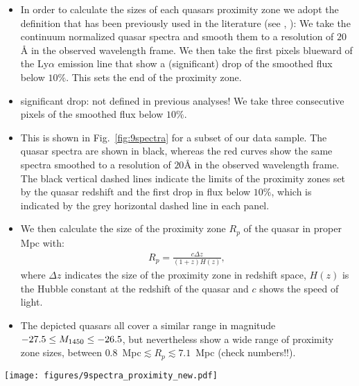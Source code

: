 \documentclass[iop]{emulateapj}
\newcommand{\lya} {Ly$\alpha$\xspace}
\begin{document}
\begin{itemize}
\item In order to calculate the sizes of each quasars proximity zone we adopt the definition that has been previously used in the literature (see \citet{Fan2006}, \citet{Carilli2010}): We take the continuum normalized quasar spectra and smooth them to a resolution of $20${\AA} in the observed wavelength frame. We then take the first pixels blueward of the \lya emission line that show a (significant) drop of the smoothed flux below $10\%$. This sets the end of the proximity zone. 
\item significant drop: not defined in previous analyses! We take three consecutive pixels of the smoothed flux below $10\%$. 
\item This is shown in Fig.~\ref{fig:9spectra} for a subset of our data sample. The quasar spectra are shown in black, whereas the red curves show the same spectra smoothed to a resolution of $20${\AA} in the observed wavelength frame. The black vertical dashed lines indicate the limits of the proximity zones set by the quasar redshift and the first drop in flux below $10\%$, which is indicated by the grey horizontal dashed line in each panel. 
\item We then calculate the size of the proximity zone $R_p$ of the quasar in proper Mpc with: 
\begin{align}
R_p = \frac{c\Delta z}{(1+z)H(z)},  
\end{align}
where $\Delta z$ indicates the size of the proximity zone in redshift space, $H(z)$ is the Hubble constant at the redshift of the quasar and $c$ shows the speed of light. 
\item The depicted quasars all cover a similar range in magnitude $-27.5 \leq M_{\rm 1450} \leq -26.5$, but nevertheless show a wide range of proximity zone sizes, between $0.8$~Mpc$\lesssim R_p\lesssim 7.1$~Mpc (check numbers!!). 
\end{itemize}


\begin{figure*}[h]
\centering
\texttt{[image: figures/9spectra\_proximity\_new.pdf]}
\caption{Continuum normalized spectra of a subset of the quasars in the data set showing the innermost $10$~pMpc region of the quasar. The red curves show the quasar spectra smoothed to a resolution of $20${\AA} in the observed wavelength frame. The horizontal grey dashed lines indicate a flux level of $10\%$. The vertical black dashed lines show the limits of the proximity zones of the quasars. \label{fig:9spectra}} 
\end{figure*}
\end{document}
